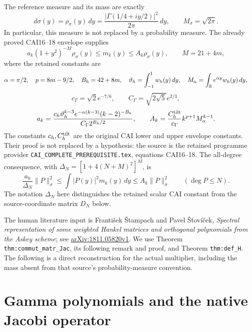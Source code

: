 \documentclass[11pt]{article}
\begin{document}
The reference measure and its mass are exactly
\[
 d\sigma(y)=\rho_\sigma(y)\,dy
 =\frac{|\Gamma(1/4+iy/2)|^2}{2\pi}\,dy,
 \qquad M_\sigma=\sqrt{2\pi}.
\]
In particular, this measure is not replaced by a probability measure.
The already proved CAI16--18 envelope supplies
\begin{equation}\label{ljacobi:eq:envelope}
 a_k(1+y^2)^{-M}\rho_\sigma(y)\leq m_k(y)
                       \leq A_k\rho_\sigma(y),\qquad M=21+4m,
\end{equation}
where the retained constants are
\[
 \alpha=\pi/2,\quad p=8m-9/2,\quad B_h=42+8m,\quad
 \vartheta_h=\int_{-1}^1w_h(y)\,dy,
 \quad M_\alpha=\int_\mathbb R e^{\alpha y}w_h(y)\,dy,
\]
\[
 c_\Gamma=\sqrt2e^{-7/6},\qquad C_\Gamma=\sqrt{2\sqrt5}e^{2/3},
\]
\[
 a_k=\frac{c_h\vartheta_h^{k-3}e^{-\alpha(k-3)}(k-2)^{-B_h}}
              {C_\Gamma2^{B_h/2}},\qquad
 A_k=\frac{C_h^{\rm tilt}}{c_\Gamma}k^{p+1}M_\alpha^{k-1}.
\]
The constants $c_h,C_h^{\rm tilt}$ are the original CAI lower and
upper envelope constants. Their proof is not replaced by a hypothesis:
the source is the retained programme provider
\texttt{CAI\_\allowbreak COMPLETE\_\allowbreak PREREQUISITE.tex},
equations CAI16--18.
The all-degree consequence, with
$\Delta_N=[1+4(N+M)^2]^M$, is
\begin{equation}\label{ljacobi:eq:finite-envelope}
 \frac{a_k}{\Delta_N}\|P\|_\sigma^2
       \leq\int|P(y)|^2m_k(y)\,dy\leq A_k\|P\|_\sigma^2
       \qquad(\deg P\leq N).
\end{equation}
The notation $\Delta_N$ here distinguishes the retained scalar CAI
constant from the source-coordinate matrix $D_N$ below.

The human literature input is Franti\v{s}ek \v{S}tampach and Pavel
\v{S}\v{t}ov\'{i}\v{c}ek, \emph{Spectral representation of some
weighted Hankel matrices and orthogonal polynomials from the Askey
scheme}; see
\href{https://arxiv.org/abs/1811.05820v1}{arXiv:1811.05820v1}.
We use Theorem \texttt{thm:commut\_\allowbreak matr\_\allowbreak Jac},
its following remark and proof,
and Theorem \texttt{thm:def\_H}. The following is a direct reconstruction
for the actual multiplier, including the mass absent from that
source's probability-measure convention.

\section{Gamma polynomials and the native Jacobi operator}
\end{document}
